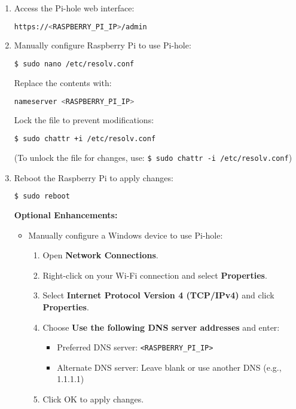 \begin{enumerate}
\item Access the Pi-hole web interface:
\begin{lstlisting}[language=bash, breaklines=true, breakatwhitespace=true, columns=fullflexible]
https://<RASPBERRY_PI_IP>/admin
\end{lstlisting}

\item Manually configure Raspberry Pi to use Pi-hole:
\begin{lstlisting}[language=bash, breaklines=true, breakatwhitespace=true, columns=fullflexible]
$ sudo nano /etc/resolv.conf
\end{lstlisting}

Replace the contents with:
\begin{lstlisting}[language=bash, breaklines=true, breakatwhitespace=true, columns=fullflexible]
nameserver <RASPBERRY_PI_IP>
\end{lstlisting}

Lock the file to prevent modifications:
\begin{lstlisting}[language=bash, breaklines=true, breakatwhitespace=true, columns=fullflexible]
$ sudo chattr +i /etc/resolv.conf
\end{lstlisting}
 
(To unlock the file for changes, use: \texttt{\$ sudo chattr -i /etc/resolv.conf})

\item Reboot the Raspberry Pi to apply changes:
\begin{lstlisting}[language=bash, breaklines=true, breakatwhitespace=true, columns=fullflexible]
$ sudo reboot
\end{lstlisting}

\noindent \textbf{Optional Enhancements:}
\begin{itemize}

\item Manually configure a Windows device to use Pi-hole:
\begin{enumerate}
\item Open \textbf{Network Connections}.
\item Right-click on your Wi-Fi connection and select \textbf{Properties}.
\item Select \textbf{Internet Protocol Version 4 (TCP/IPv4)} and click \textbf{Properties}.
\item Choose \textbf{Use the following DNS server addresses} and enter:
\begin{itemize}
\item Preferred DNS server: \texttt{\textless RASPBERRY\_PI\_IP\textgreater}
\item Alternate DNS server: Leave blank or use another DNS (e.g., 1.1.1.1)
\end{itemize}
\item Click OK to apply changes.
\end{enumerate}

\end{itemize}

\end{enumerate}